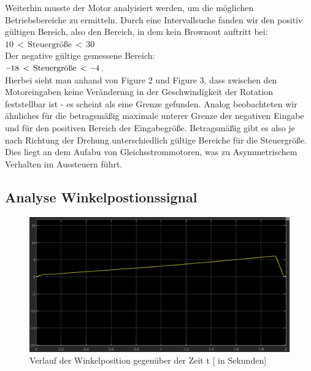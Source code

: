 \documentclass{article}
\newcommand{\minus}{\scalebox{0.75}[1.0]{$-$}}
\begin{document}
Weiterhin musste der Motor analyisiert werden, um die möglichen Betriebsbereiche zu ermitteln.
Durch eine Intervallsuche fanden wir den positiv gültigen Bereich, also den Bereich, in dem kein Brownout auftritt bei:
\\$10\,< \, \text{Steuergröße} \,< \, 30$\\Der negative gültige gemessene Bereich:\\ $\minus 18\,< \, \text{Steuergröße} \,< \, \minus4$.\\
Hierbei sieht man anhand von Figure 2 und Figure 3, dass zwischen den Motoreingaben keine Veränderung in der Geschwindigkeit der Rotation feststellbar ist - es scheint als eine Grenze gefunden.
Analog beobachteten wir ähnliches für die betragsmäßig maximale unterer Grenze der negativen Eingabe und für den positiven Bereich der Eingabegröße.
Betragsmäßig gibt es also je nach Richtung der Drehung unterschiedlich gültige Bereiche für die Steuergröße. 
Dies liegt an dem Aufabu von Gleichsstrommotoren, was zu Asymmetrischem Verhalten im Aussteuern führt.
\newpage

\subsection{Analyse Winkelpostionssignal}
\vspace{5mm}

\begin{figure}[h]
  \centering
  \begin{minipage}[b]{1\textwidth}
    \includegraphics[width=\textwidth]{angle.png}
    \caption{Verlauf der Winkelposition gegenüber der Zeit t [ in Sekunden]}
  \end{minipage}
\end{figure}
\end{document}
